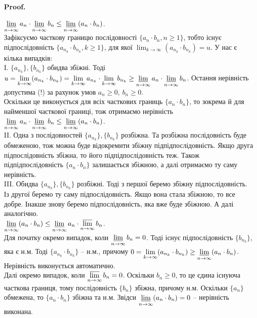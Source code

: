 \documentclass[a4paper, 14pt]{article}
\makeatletter
\def\qed{$\blacksquare$}
\theoremstyle{theoremdd}
\theoremstyle{theoremdd}
\theoremstyle{theoremdd}
\theoremstyle{theoremdd}
\theoremstyle{theoremdd}
\theoremstyle{theoremdd}
\theoremstyle{theoremdd}
\theoremstyle{theoremdd}
\renewenvironment{proof}[1][Proof.\\]{\par
\pushQED{\hfill \qed}%
\normalfont \topsep6\p@\@plus6\p@\relax
\trivlist
\item\relax
{\bfseries
#1\@addpunct{.}}\hspace\labelsep\ignorespaces
}{%
\popQED\endtrivlist\@endpefalse
}
\makeatother
\begin{document}
\begin{proof}
	$\displaystyle\varliminf_{n \to \infty} a_n \cdot \varliminf_{n \to \infty} b_n \leq \varliminf_{n \to \infty} (a_n \cdot b_n)$.\\
	Зафіксуємо часткову границю послідовності $\{a_n \cdot b_n, n \geq 1\}$, тобто існує підпослідовність $\{a_{n_k} \cdot b_{n_k}, k \geq 1\}$, для якої $\displaystyle\lim_{k \to \infty} (a_{n_k} \cdot b_{n_k}) = u$. У нас є кілька випадків:\\
	I. $\{a_{n_k}\}, \{b_{n_k}\}$ обидва збіжні. Тоді $u = \displaystyle\lim_{k \to \infty} (a_{n_k} \cdot b_{n_k}) = \lim_{k \to \infty} a_{n_k} \cdot \lim_{k \to \infty} b_{n_k} \geq \varliminf_{n \to \infty} a_n \cdot \varliminf_{n \to \infty} b_n$. Остання нерівність допустима (!) за рахунок умов $a_n \geq 0,\ b_n \geq 0$.\\
	Оскільки це виконується для всіх часткових границь $\{a_n \cdot b_n\}$, то зокрема й для найменшої часткової границі, тож отримаємо нерівність  $\displaystyle\varliminf_{n \to \infty} a_n \cdot \varliminf_{n \to \infty} b_n \leq \varliminf_{n \to \infty} (a_n \cdot b_n)$.\\
	II. Одна з послідовностей $\{a_{n_k}\}, \{b_{n_k}\}$ розбіжна. Та розбіжна послідовність буде обмеженою, тож можна буде відокремити збіжну підпідпослідовність. Якщо друга підпослідовність збіжна, то його підпідпослідовність теж. Також підпідпослідовність $\{a_n \cdot b_n\}$ залишається збіжною, а далі отримаємо ту саму нерівність.\\
	III. Обидва $\{a_{n_k}\}, \{b_{n_k}\}$ розбіжні. Тоді з першої беремо збіжну підпослідовність. Із другої беремо ту саму підпослідовність. Якщо вона стала збіжною, то все добре. Інакше знову беремо підпослідовність, яка вже буде збіжною. А далі аналогічно.
	\bigskip \\
	$\displaystyle\varliminf_{n \to \infty} (a_n \cdot b_n) \leq \varliminf_{n \to \infty} a_n \cdot \varlimsup_{n \to \infty} b_n$.\\
	Для початку окремо випадок, коли $\displaystyle\varliminf_{n \to \infty} b_n = 0$. Тоді існує підпослідовність $\{b_{n_k}\}$, яка є н.м. Тоді $\{a_{n_k} \cdot b_{n_k}\}$ -- н.м., причому $0 = \displaystyle\lim_{k \to \infty} (a_{n_k} \cdot b_{n_k}) \geq \varliminf_{n \to \infty} (a_{n} \cdot b_n)$. Нерівність виконується автоматично.\\
	Далі окремо випадок, коли $\displaystyle\varlimsup_{n \to \infty} b_n = 0$. Оскільки $b_n \geq 0$, то це єдина існуюча часткова границя, тому послідовність $\{b_n\}$ збіжна, причому н.м. Оскільки $\{a_n\}$ обмежена, то $\{a_n \cdot b_n\}$ збіжна та н.м. Звідси $\displaystyle\varliminf_{n \to \infty} (a_n \cdot b_n) = 0$ -- нерівність виконана.\\

\end{proof}
\end{document}
